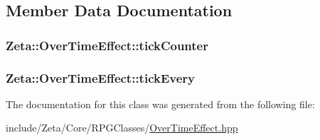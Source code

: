 \subsection{Member Data Documentation}
\hypertarget{classZeta_1_1OverTimeEffect_a90137be439da945f6b551ea974ac5890}{
\subsubsection[{tick\+Counter}]{ Zeta\+::\+Over\+Time\+Effect\+::tick\+Counter\hspace{0.3cm}{\ttfamily [private]}}}\label{classZeta_1_1OverTimeEffect_a90137be439da945f6b551ea974ac5890}
\hypertarget{classZeta_1_1OverTimeEffect_a7ce6ce07d39162a1d43a5f57d3acd980}{
\subsubsection[{tick\+Every}]{ Zeta\+::\+Over\+Time\+Effect\+::tick\+Every\hspace{0.3cm}{\ttfamily [private]}}}\label{classZeta_1_1OverTimeEffect_a7ce6ce07d39162a1d43a5f57d3acd980}


The documentation for this class was generated from the following file\+:\begin{DoxyCompactItemize}
\item 
include/\+Zeta/\+Core/\+R\+P\+G\+Classes/\hyperlink{OverTimeEffect_8hpp}{Over\+Time\+Effect.\+hpp}\end{DoxyCompactItemize}

